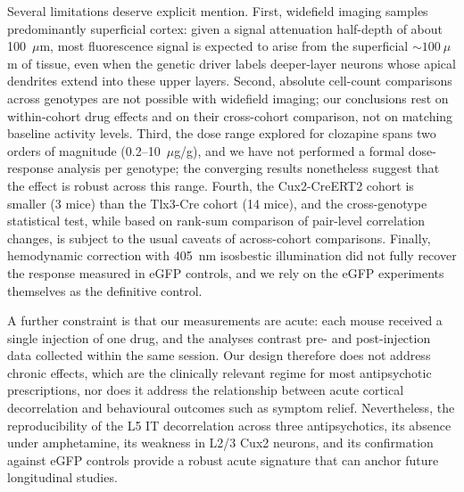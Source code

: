 \documentclass[11pt]{article}
\begin{document}
Several limitations deserve explicit mention. First, widefield imaging samples predominantly superficial cortex: given a signal attenuation half-depth of about 100~$\mu$m, most fluorescence signal is expected to arise from the superficial ${\sim}100~\mu$m of tissue, even when the genetic driver labels deeper-layer neurons whose apical dendrites extend into these upper layers. Second, absolute cell-count comparisons across genotypes are not possible with widefield imaging; our conclusions rest on within-cohort drug effects and on their cross-cohort comparison, not on matching baseline activity levels. Third, the dose range explored for clozapine spans two orders of magnitude (0.2--10~$\mu$g/g), and we have not performed a formal dose-response analysis per genotype; the converging results nonetheless suggest that the effect is robust across this range. Fourth, the Cux2-CreERT2 cohort is smaller (3 mice) than the Tlx3-Cre cohort (14 mice), and the cross-genotype statistical test, while based on rank-sum comparison of pair-level correlation changes, is subject to the usual caveats of across-cohort comparisons. Finally, hemodynamic correction with 405~nm isosbestic illumination did not fully recover the response measured in eGFP controls, and we rely on the eGFP experiments themselves as the definitive control.

A further constraint is that our measurements are acute: each mouse received a single injection of one drug, and the analyses contrast pre- and post-injection data collected within the same session. Our design therefore does not address chronic effects, which are the clinically relevant regime for most antipsychotic prescriptions, nor does it address the relationship between acute cortical decorrelation and behavioural outcomes such as symptom relief. Nevertheless, the reproducibility of the L5 IT decorrelation across three antipsychotics, its absence under amphetamine, its weakness in L2/3 Cux2 neurons, and its confirmation against eGFP controls provide a robust acute signature that can anchor future longitudinal studies.
\end{document}

